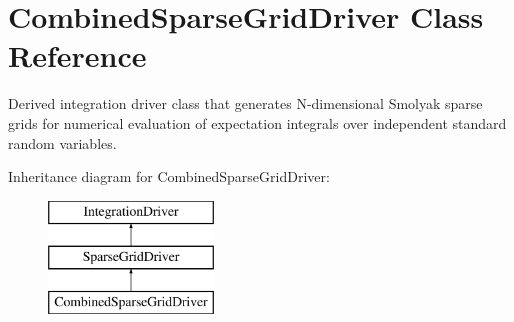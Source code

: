 \section{Combined\+Sparse\+Grid\+Driver Class Reference}
\label{classPecos_1_1CombinedSparseGridDriver}


Derived integration driver class that generates N-\/dimensional Smolyak sparse grids for numerical evaluation of expectation integrals over independent standard random variables.  


Inheritance diagram for Combined\+Sparse\+Grid\+Driver\+:\begin{figure}[H]
\begin{center}
\leavevmode
\includegraphics[height=3.000000cm]{classPecos_1_1CombinedSparseGridDriver}
\end{center}
\end{figure}
